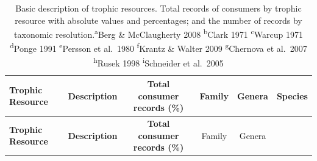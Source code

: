 \documentclass[11pt]{article}
\begin{document}
\begin{longtable}[]{@{}lccccc@{}}
\caption{Basic description of trophic resources. Total records of
consumers by trophic resource with absolute values and percentages; and
the number of records by taxonomic resolution.\textsuperscript{a}Berg \&
McClaugherty 2008 \textsuperscript{b}Clark 1971
\textsuperscript{c}Warcup 1971 \textsuperscript{d}Ponge 1991
\textsuperscript{e}Persson et al.~1980 \textsuperscript{f}Krantz \&
Walter 2009 \textsuperscript{g}Chernova et al.~2007
\textsuperscript{h}Rusek 1998 \textsuperscript{i}Schneider et
al.~2005}\tabularnewline
\toprule
\begin{minipage}[b]{0.11\columnwidth}\raggedright
\textbf{Trophic Resource}\strut
\end{minipage} & \begin{minipage}[b]{0.45\columnwidth}\centering
\textbf{Description}\strut
\end{minipage} & \begin{minipage}[b]{0.14\columnwidth}\centering
\textbf{Total consumer records (\%)}\strut
\end{minipage} & \begin{minipage}[b]{0.04\columnwidth}\centering
Family\strut
\end{minipage} & \begin{minipage}[b]{0.04\columnwidth}\centering
Genera\strut
\end{minipage} & \begin{minipage}[b]{0.04\columnwidth}\centering
Species\strut
\end{minipage}\tabularnewline
\midrule
\endfirsthead
\toprule
\begin{minipage}[b]{0.11\columnwidth}\raggedright
\textbf{Trophic Resource}\strut
\end{minipage} & \begin{minipage}[b]{0.45\columnwidth}\centering
\textbf{Description}\strut
\end{minipage} & \begin{minipage}[b]{0.14\columnwidth}\centering
\textbf{Total consumer records (\%)}\strut
\end{minipage} & \begin{minipage}[b]{0.04\columnwidth}\centering
Family\strut
\end{minipage} & \begin{minipage}[b]{0.04\columnwidth}\centering
Genera\strut
\end{minipage} & \begin{minipage}[b]{0.04\columnwidth}\centering

\end{minipage}
\end{longtable}
\end{document}
